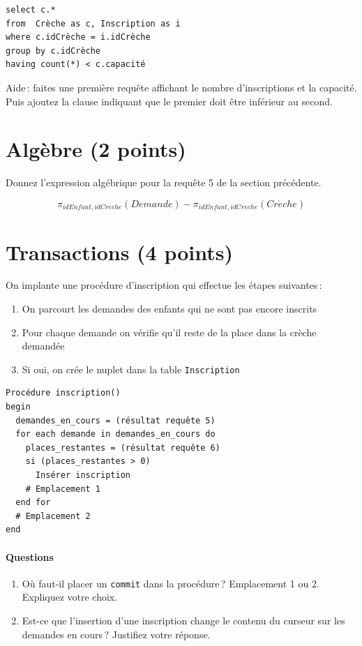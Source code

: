 \begin{enumerate}
\begin{solution}
\begin{small}
\begin{verbatim}
select c.*
from  Crèche as c, Inscription as i
where c.idCrèche = i.idCrèche
group by c.idCrèche
having count(*) < c.capacité
\end{verbatim}
\end{small}
\end{solution}
   Aide\,: faites une première requête affichant le nombre d'inscriptions
      et  la capacité. Puis ajoutez la clause indiquant que le premier doit
      être inférieur au second.
\end{enumerate}
 

\section{Algèbre (2 points)}

Donnez l'expression algébrique pour la requête 5 de la section précédente.


\begin{solution}
$$\pi_{idEnfant,idCreche} (Demande) - \pi_{idEnfant,idCreche} (Cr\acute{e}che)$$
\end{solution}

\section{Transactions (4 points)}

On implante une procédure d'inscription qui effectue les étapes suivantes\,:

\begin{enumerate}
  \item On parcourt les demandes des enfants qui ne sont pas encore inscrits
  \item Pour chaque demande on vérifie qu'il reste de la place dans la crèche demandée
  \item Si oui, on crée le nuplet dans la table \texttt{Inscription}
\end{enumerate}

\begin{verbatim}
Procédure inscription()
begin
  demandes_en_cours = (résultat requête 5)
  for each demande in demandes_en_cours do
    places_restantes = (résultat requête 6)
    si (places_restantes > 0)
      Insérer inscription
    # Emplacement 1
  end for
  # Emplacement 2
end
\end{verbatim}
\paragraph{Questions}

\begin{enumerate}
  \item Où faut-il placer un \texttt{commit} dans la procédure\,? Emplacement 1 ou 2. Expliquez
votre choix.
  \item Est-ce que l'insertion d'une inscription change le contenu du curseur sur les demandes
      en cours\,?  Justifiez votre réponse.
\end{enumerate}



